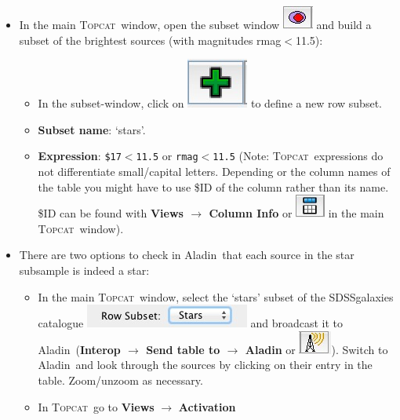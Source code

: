 \documentclass [a4paper, 12pt]{article}
\newcommand{\aladin}{{\textsc{A}{ladin}}}
\newcommand{\topcat}{{\textsc{Topcat}}}
\begin{document}
\begin{itemize}
\item In the main \topcat\ window, open the subset window  
\includegraphics[width=0.04  \textwidth]{../images/topcat_button_subset.jpg} 
and build a subset of the brightest sources (with magnitudes rmag$<$11.5):
\begin{itemize}
    \item In the subset-window, click on \includegraphics[width=0.04  
    \textwidth]{../images/topcat_button_add.jpg}  to define a new row subset.
    \item \textbf{Subset name}: `stars'.
    \item \textbf{Expression}: \texttt{\$17$<$11.5} or \texttt{rmag$<$11.5} 
    (Note: \topcat\ expressions 
    do not differentiate small/capital letters. Depending or the column names 
    of the table you might have to use \$ID of the column rather than its name. 
    \$ID can be found with \textbf{Views $\rightarrow$ Column Info} or 
    \includegraphics[width=0.04 
    \textwidth]{../images/topcat_button_metadata.jpg} in 
    the main \topcat\ window).
\end{itemize}
\item There are two options to check in \aladin\ that each source in the star 
subsample is indeed a star:
\begin{itemize}
    \item In the main \topcat\ window, select the `stars' subset of the 
    SDSSgalaxies catalogue  \includegraphics[width=0.2  
    \textwidth]{../images/topcat_dropdown-menu_subsets.jpg} and broadcast it to 
    \aladin\ 
    (\textbf{Interop $\rightarrow$ Send table to $\rightarrow$ Aladin} or  
    \includegraphics[width=0.04  
    \textwidth]{../images/topcat_button_broadcast.jpg}). Switch to 
    \aladin\ and look through the sources by clicking on their entry in the 
    table. Zoom/unzoom as necessary. 
    \item In \topcat\ go to \textbf{Views} $\rightarrow$ \textbf{Activation 
}
\end{itemize}
\end{itemize}
\end{document}
